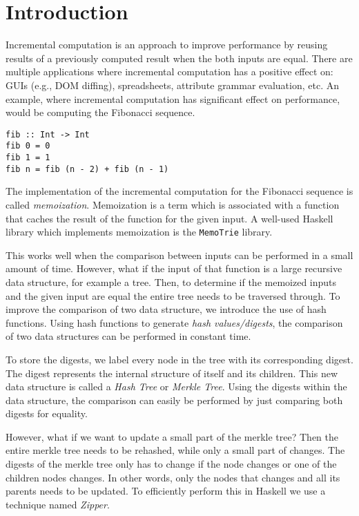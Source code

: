 \chapter{Introduction}



Incremental computation is an approach to improve performance by reusing results of a previously computed result when the both inputs are equal. There are multiple applications where incremental computation has a positive effect on: GUIs (e.g., DOM diffing), spreadsheets, attribute grammar evaluation, etc.  An example, where incremental computation has significant effect on performance, would be computing the Fibonacci sequence.

\begin{verbatim}
fib :: Int -> Int
fib 0 = 0
fib 1 = 1
fib n = fib (n - 2) + fib (n - 1)
\end{verbatim}

The implementation of the incremental computation for the Fibonacci sequence is called \textit{memoization}. Memoization is a term which is associated with a function that caches the result of the function for the given input. A well-used Haskell library which implements memoization is the \texttt{MemoTrie} library\cite*{hackage2022memotrie}.

This works well when the comparison between inputs can be performed in a small amount of time. However, what if the input of that function is a large recursive data structure, for example a tree. Then, to determine if the memoized inputs and the given input are equal the entire tree needs to be traversed through. To improve the comparison of two data structure, we introduce the use of hash functions. Using hash functions to generate \textit{hash values/digests}, the comparison of two data structures can be performed in constant time.

To store the digests, we label every node in the tree with its corresponding digest. The digest represents the internal structure of itself and its children. This new data structure is called a \textit{Hash Tree} or \textit{Merkle Tree}\cite{merkle1987digital}. Using the digests within the data structure, the comparison can easily be performed by just comparing both digests for equality.

However, what if we want to update a small part of the merkle tree? Then the entire merkle tree needs to be rehashed, while only a small part of changes. The digests of the merkle tree only has to change if the node changes or one of the children nodes changes. In other words, only the nodes that changes and all its parents needs to be updated. To efficiently perform this in Haskell we use a technique named \textit{Zipper}\cite{huet1997zipper}.  

